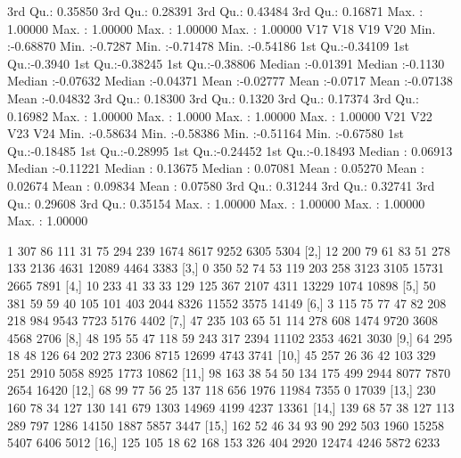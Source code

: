 \documentclass[a4paper, 12pt]{article}
\begin{document}
\begin{table}[H]
\begin{Schunk}
\begin{Soutput}
 3rd Qu.: 0.35850   3rd Qu.: 0.28391   3rd Qu.: 0.43484   3rd Qu.: 0.16871  
 Max.   : 1.00000   Max.   : 1.00000   Max.   : 1.00000   Max.   : 1.00000  
      V17                V18               V19                V20          
 Min.   :-0.68870   Min.   :-0.7287   Min.   :-0.71478   Min.   :-0.54186  
 1st Qu.:-0.34109   1st Qu.:-0.3940   1st Qu.:-0.38245   1st Qu.:-0.38806  
 Median :-0.01391   Median :-0.1130   Median :-0.07632   Median :-0.04371  
 Mean   :-0.02777   Mean   :-0.0717   Mean   :-0.07138   Mean   :-0.04832  
 3rd Qu.: 0.18300   3rd Qu.: 0.1320   3rd Qu.: 0.17374   3rd Qu.: 0.16982  
 Max.   : 1.00000   Max.   : 1.0000   Max.   : 1.00000   Max.   : 1.00000  
      V21                V22                V23                V24          
 Min.   :-0.58634   Min.   :-0.58386   Min.   :-0.51164   Min.   :-0.67580  
 1st Qu.:-0.18485   1st Qu.:-0.28995   1st Qu.:-0.24452   1st Qu.:-0.18493  
 Median : 0.06913   Median :-0.11221   Median : 0.13675   Median : 0.07081  
 Mean   : 0.05270   Mean   : 0.02674   Mean   : 0.09834   Mean   : 0.07580  
 3rd Qu.: 0.31244   3rd Qu.: 0.32741   3rd Qu.: 0.29608   3rd Qu.: 0.35154  
 Max.   : 1.00000   Max.   : 1.00000   Max.   : 1.00000   Max.   : 1.00000  
\end{Soutput}
\begin{Soutput}
      [,1] [,2] [,3] [,4] [,5] [,6] [,7] [,8] [,9] [,10] [,11] [,12] [,13]
 [1,]    1  307   86  111   31   75  294  239 1674  8617  9252  6305  5304
 [2,]   12  200   79   61   83   51  278  133 2136  4631 12089  4464  3383
 [3,]    0  350   52   74   53  119  203  258 3123  3105 15731  2665  7891
 [4,]   10  233   41   33   33  129  125  367 2107  4311 13229  1074 10898
 [5,]   50  381   59   59   40  105  101  403 2044  8326 11552  3575 14149
 [6,]    3  115   75   77   47   82  208  218  984  9543  7723  5176  4402
 [7,]   47  235  103   65   51  114  278  608 1474  9720  3608  4568  2706
 [8,]   48  195   55   47  118   59  243  317 2394 11102  2353  4621  3030
 [9,]   64  295   18   48  126   64  202  273 2306  8715 12699  4743  3741
[10,]   45  257   26   36   42  103  329  251 2910  5058  8925  1773 10862
[11,]   98  163   38   54   50  134  175  499 2944  8077  7870  2654 16420
[12,]   68   99   77   56   25  137  118  656 1976 11984  7355     0 17039
[13,]  230  160   78   34  127  130  141  679 1303 14969  4199  4237 13361
[14,]  139   68   57   38  127  113  289  797 1286 14150  1887  5857  3447
[15,]  162   52   46   34   93   90  292  503 1960 15258  5407  6406  5012
[16,]  125  105   18   62  168  153  326  404 2920 12474  4246  5872  6233

\end{Soutput}
\end{Schunk}
\end{table}
\end{document}

